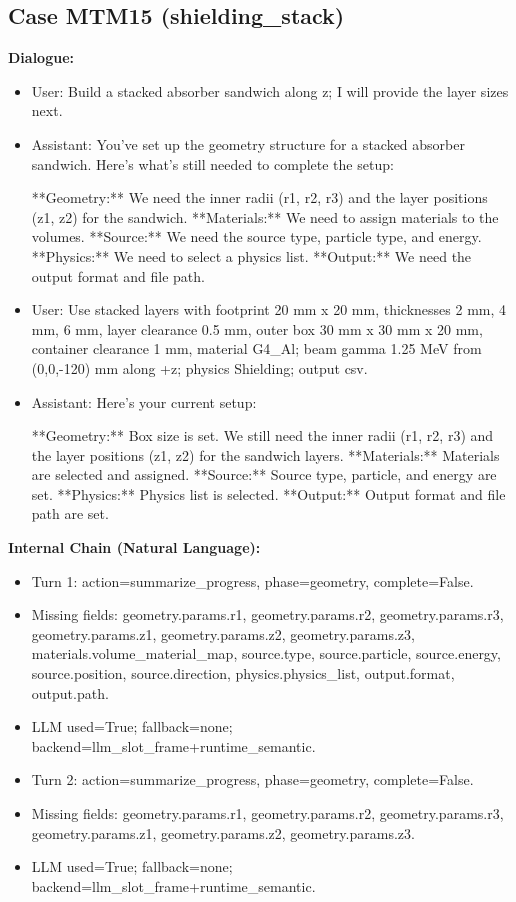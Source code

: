 \documentclass[11pt]{ctexart}
\begin{document}
\subsection{Case MTM15 (shielding\_stack)}
\textbf{Dialogue:}
\begin{itemize}
\item User: Build a stacked absorber sandwich along z; I will provide the layer sizes next.
\item Assistant: You've set up the geometry structure for a stacked absorber sandwich. Here's what's still needed to complete the setup:

**Geometry:** We need the inner radii (r1, r2, r3) and the layer positions (z1, z2) for the sandwich.
**Materials:** We need to assign materials to the volumes.
**Source:** We need the source type, particle type, and energy.
**Physics:** We need to select a physics list.
**Output:** We need the output format and file path.
\item User: Use stacked layers with footprint 20 mm x 20 mm, thicknesses 2 mm, 4 mm, 6 mm, layer clearance 0.5 mm, outer box 30 mm x 30 mm x 20 mm, container clearance 1 mm, material G4\_Al; beam gamma 1.25 MeV from (0,0,-120) mm along +z; physics Shielding; output csv.
\item Assistant: Here's your current setup:

**Geometry:** Box size is set. We still need the inner radii (r1, r2, r3) and the layer positions (z1, z2) for the sandwich layers.
**Materials:** Materials are selected and assigned.
**Source:** Source type, particle, and energy are set.
**Physics:** Physics list is selected.
**Output:** Output format and file path are set.
\end{itemize}
\textbf{Internal Chain (Natural Language):}
\begin{itemize}
\item Turn 1: action=summarize\_progress, phase=geometry, complete=False.
\item Missing fields: geometry.params.r1, geometry.params.r2, geometry.params.r3, geometry.params.z1, geometry.params.z2, geometry.params.z3, materials.volume\_material\_map, source.type, source.particle, source.energy, source.position, source.direction, physics.physics\_list, output.format, output.path.
\item LLM used=True; fallback=none; backend=llm\_slot\_frame+runtime\_semantic.
\item Turn 2: action=summarize\_progress, phase=geometry, complete=False.
\item Missing fields: geometry.params.r1, geometry.params.r2, geometry.params.r3, geometry.params.z1, geometry.params.z2, geometry.params.z3.
\item LLM used=True; fallback=none; backend=llm\_slot\_frame+runtime\_semantic.
\end{itemize}
\end{document}
